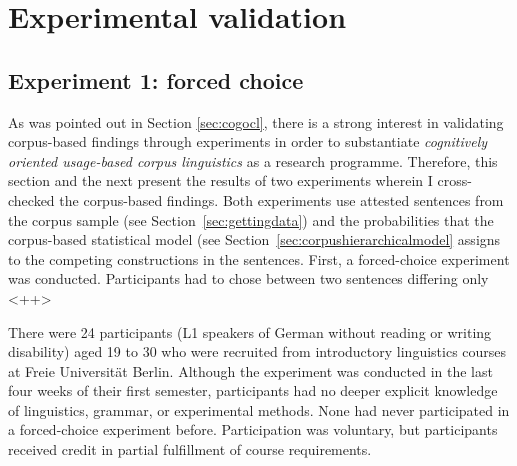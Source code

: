 \documentclass[USenglish]{article}
\begin{document}


\section{Experimental validation}
\label{sec:externalvalidation}

\subsection{Experiment 1: forced choice}

%

As was pointed out in Section \ref{sec:cogocl}, there is a strong interest in validating corpus-based findings through experiments in order to substantiate \textit{cognitively oriented usage-based corpus linguistics} as a research programme.
Therefore, this section and the next present the results of two experiments wherein I cross-checked the corpus-based findings.
Both experiments use attested sentences from the corpus sample (see Section~\ref{sec:gettingdata}) and the probabilities that the corpus-based statistical model (see Section~\ref{sec:corpushierarchicalmodel} assigns to the competing constructions in the sentences.
First, a forced-choice experiment was conducted.
Participants had to chose between two sentences differing only <++>

There were 24 participants (L1 speakers of German without reading or writing disability) aged 19 to 30 who were recruited from introductory linguistics courses at Freie Universität Berlin.
Although the experiment was conducted in the last four weeks of their first semester, participants had no deeper explicit knowledge of linguistics, grammar, or experimental methods.
None had never participated in a forced-choice experiment before.
Participation was voluntary, but participants received credit in partial fulfillment of course requirements.
\end{document}
